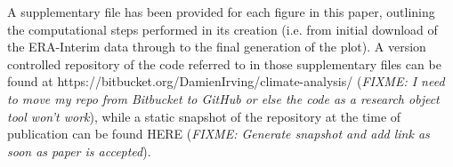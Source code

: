 A supplementary file has been provided for each figure in this paper, outlining the computational steps performed in its creation (i.e. from initial download of the ERA-Interim data through to the final generation of the plot). A version controlled repository of the code referred to in those supplementary files can be found at https://bitbucket.org/DamienIrving/climate-analysis/ (\textit{FIXME: I need to move my repo from Bitbucket to GitHub or else the code as a research object tool won't work}), while a static snapshot of the repository at the time of publication can be found HERE (\textit{FIXME: Generate snapshot and add link as soon as paper is accepted}).